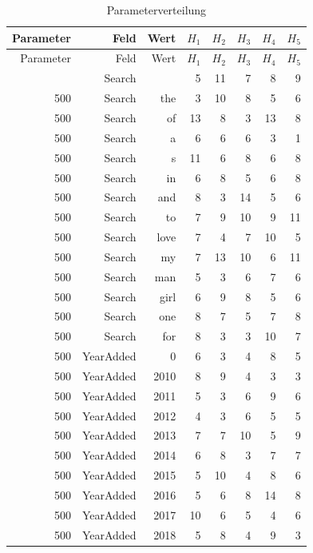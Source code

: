 
\renewcommand{\arraystretch}{0.7}
\begin{longtable}{rrrrrrrr}
\caption{Parameterverteilung}\label{tab:parameterverteilung}\\
\toprule
Parameter & Feld & Wert & ${H_1}$ & ${H_2}$ & ${H_3}$ & ${H_4}$ & ${H_5}$ \\
\midrule
\endfirsthead

\toprule
Parameter & Feld & Wert & ${H_1}$ & ${H_2}$ & ${H_3}$ & ${H_4}$ & ${H_5}$ \\
\midrule
\endhead

\endfoot

\endlastfoot
	500 & Search &  & 5 & 11 & 7 & 8 & 9 \\
	500 & Search & the & 3 & 10 & 8 & 5 & 6 \\
	500 & Search & of & 13 & 8 & 3 & 13 & 8 \\
	500 & Search & a & 6 & 6 & 6 & 3 & 1 \\
	500 & Search & s & 11 & 6 & 8 & 6 & 8 \\
	500 & Search & in & 6 & 8 & 5 & 6 & 8 \\
	500 & Search & and & 8 & 3 & 14 & 5 & 6 \\
	500 & Search & to & 7 & 9 & 10 & 9 & 11 \\
	500 & Search & love & 7 & 4 & 7 & 10 & 5 \\
	500 & Search & my & 7 & 13 & 10 & 6 & 11 \\
	500 & Search & man & 5 & 3 & 6 & 7 & 6 \\
	500 & Search & girl & 6 & 9 & 8 & 5 & 6 \\
	500 & Search & one & 8 & 7 & 5 & 7 & 8 \\
	500 & Search & for & 8 & 3 & 3 & 10 & 7 \\
	500 & YearAdded & 0 & 6 & 3 & 4 & 8 & 5 \\
	500 & YearAdded & 2010 & 8 & 9 & 4 & 3 & 3 \\
	500 & YearAdded & 2011 & 5 & 3 & 6 & 9 & 6 \\
	500 & YearAdded & 2012 & 4 & 3 & 6 & 5 & 5 \\
	500 & YearAdded & 2013 & 7 & 7 & 10 & 5 & 9 \\
	500 & YearAdded & 2014 & 6 & 8 & 3 & 7 & 7 \\
	500 & YearAdded & 2015 & 5 & 10 & 4 & 8 & 6 \\
	500 & YearAdded & 2016 & 5 & 6 & 8 & 14 & 8 \\
	500 & YearAdded & 2017 & 10 & 6 & 5 & 4 & 6 \\
	500 & YearAdded & 2018 & 5 & 8 & 4 & 9 & 3 \\

\end{longtable}
